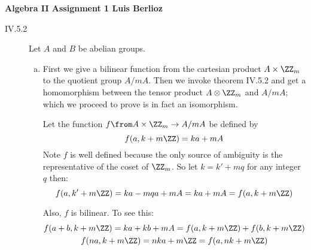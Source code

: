 \textbf{Algebra II Assignment 1 \hspace{\fill} Luis Berlioz}
\begin{description}
\item[IV.5.2] Let $A$ and $B$ be abelian groups.
\begin{enumerate}[(a)]
\item First we give a bilinear function from the cartesian product $A\times \ZZ_m$ to the quotient group $A/mA$. Then we invoke theorem IV.5.2 and get a homomorphism between the tensor product $A\otimes \ZZ_m$ and $A/mA$; which we proceed to prove is in fact an isomorphism.

    Let the function $f\from A\times \ZZ_m\to A/mA$ be defined by $$f(a,k+m\ZZ) = ka+mA$$
    Note $f$ is well defined because the only source of ambiguity is the representative of the coset of $\ZZ_m$. So let $k=k'+mq$ for any integer $q$ then:
    $$f(a,k' + m\ZZ) = ka - mqa+mA=ka+mA = f(a,k+m\ZZ)$$

    Also, $f$ is bilinear. To see this:
    \begin{gather*}
        f(a+b,k+m\ZZ)=ka + kb +mA =f(a,k+m\ZZ)+f(b,k+m\ZZ)\\
        f(na,k+m\ZZ) = nka+m\ZZ = f(a,nk+m\ZZ)
    \end{gather*}


\end{enumerate}
\end{description}
